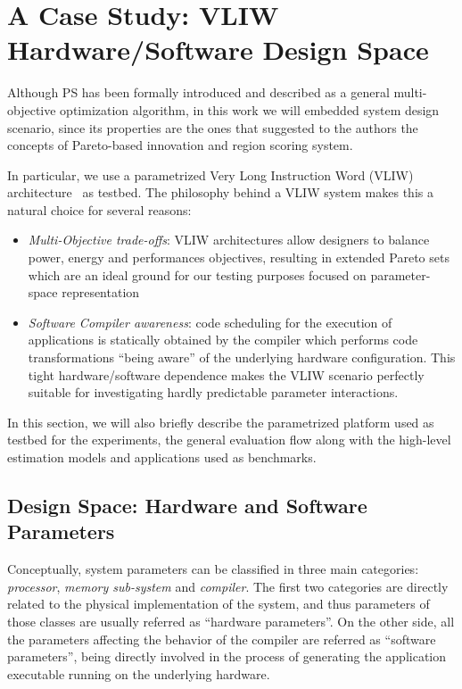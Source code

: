 \section{A Case Study: VLIW Hardware/Software Design Space}
Although PS has been formally introduced and described as a general
multi-objective optimization algorithm, in this work we will
embedded system design scenario,  since its properties
are the ones that suggested to the authors the concepts of Pareto-based
innovation and region scoring system.

In particular, we use a parametrized Very Long Instruction
Word (VLIW) architecture~\cite{kathail_tr00} as testbed. The philosophy
behind a VLIW system makes this a natural choice for several reasons:
\begin{itemize}
\item \emph{Multi-Objective trade-offs}: VLIW architectures allow designers
to balance power, energy and performances objectives, resulting
in extended Pareto sets which are an ideal ground for our testing
purposes focused on parameter-space representation
\item \emph{Software Compiler awareness}: code scheduling for the execution of
applications is statically obtained by the compiler which
performs code transformations ``being aware'' of the underlying hardware
configuration.  This tight hardware/software dependence makes the
VLIW scenario perfectly suitable for investigating hardly predictable
parameter interactions.
\end{itemize}

In this section, we will also briefly describe the parametrized platform used
as testbed for the experiments, the general evaluation flow along with
the high-level estimation models and applications used as benchmarks.

\subsection{Design Space: Hardware and Software Parameters}
Conceptually, system parameters can be classified in three main categories:
\emph{processor}, \emph{memory sub-system} and \emph{compiler}. The
first two categories are directly related to the physical
implementation of the system, and thus parameters of those
classes are usually referred as ``hardware parameters''. On the other
side, all the parameters affecting the behavior of the compiler
are referred as ``software parameters'', being directly involved in
the process of generating the application executable running on the
underlying hardware.

